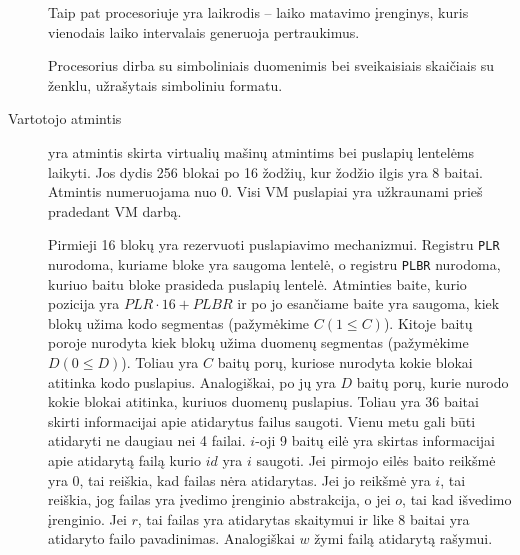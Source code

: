 \begin{description}
    Taip pat procesoriuje yra laikrodis – laiko matavimo įrenginys, kuris
    vienodais laiko intervalais generuoja pertraukimus. 

    Procesorius dirba su simboliniais duomenimis bei sveikaisiais 
    skaičiais su ženklu, užrašytais simboliniu formatu.
  \item[Vartotojo atmintis] yra atmintis skirta virtualių mašinų atmintims 
    bei puslapių lentelėms laikyti. Jos dydis 256 blokai po 16 žodžių, kur
    žodžio ilgis yra 8 baitai. Atmintis numeruojama nuo 0. Visi VM 
    puslapiai yra užkraunami prieš pradedant VM darbą.

    Pirmieji 16 blokų yra rezervuoti puslapiavimo mechanizmui. Registru
    \verb|PLR| nurodoma, kuriame bloke yra saugoma lentelė, o registru
    \verb|PLBR| nurodoma, kuriuo baitu bloke prasideda puslapių lentelė.
    Atminties baite, kurio pozicija yra $PLR \cdot 16 + PLBR$ ir po jo 
    esančiame baite yra saugoma, kiek blokų užima kodo segmentas 
    (pažymėkime $C (1 \leq C)$). Kitoje baitų poroje nurodyta kiek blokų 
    užima duomenų segmentas (pažymėkime $D (0 \leq D)$). Toliau yra 
    $C$ baitų porų, kuriose nurodyta kokie blokai atitinka kodo puslapius.
    Analogiškai, po jų yra $D$ baitų porų, kurie nurodo kokie blokai 
    atitinka, kuriuos duomenų puslapius. Toliau yra 36 baitai skirti
    informacijai apie atidarytus failus saugoti. Vienu metu gali
    būti atidaryti ne daugiau nei 4 failai. $i$-oji 9 baitų eilė yra skirtas
    informacijai apie atidarytą failą kurio $id$ yra $i$ saugoti. Jei
    pirmojo eilės baito reikšmė yra $0$, tai reiškia, kad failas nėra
    atidarytas. Jei jo reikšmė yra $i$, tai reiškia, jog failas yra
    įvedimo įrenginio abstrakcija, o jei $o$, tai kad išvedimo įrenginio.
    Jei $r$, tai failas yra atidarytas skaitymui ir like 8 baitai yra
    atidaryto failo pavadinimas. Analogiškai $w$ žymi failą atidarytą
    rašymui.


\end{description}
